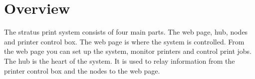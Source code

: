 


  

  \pagecolor{white}

  \tableofcontents

  \newpage
  \section{Overview}
  The stratus print system consists of four main parts. The web page, hub, nodes and printer
  control box. The web page is where the system is controlled. From the web page you can set up
  the system, monitor printers and control print jobs. The hub is the heart of the system. It is
  used to relay information from the printer control box and the nodes to the web page.
  \newpage
  

  \newpage
  

  \newpage
  

  \newpage
  

  
